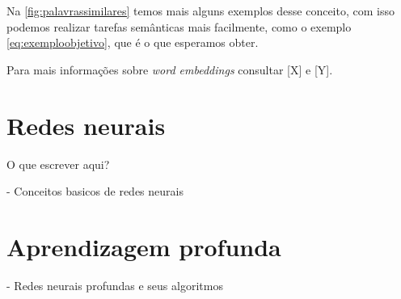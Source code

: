 Na \autoref{fig:palavrassimilares} temos mais alguns exemplos desse conceito, com isso podemos realizar tarefas semânticas mais facilmente, como o exemplo \ref{eq:exemploobjetivo}, que é o que esperamos obter.

Para mais informações sobre \textit{word embeddings} consultar [X] e [Y].



\section{Redes neurais}

O que escrever aqui? 

- Conceitos basicos de redes neurais



\section{Aprendizagem profunda}

- Redes neurais profundas e seus algoritmos